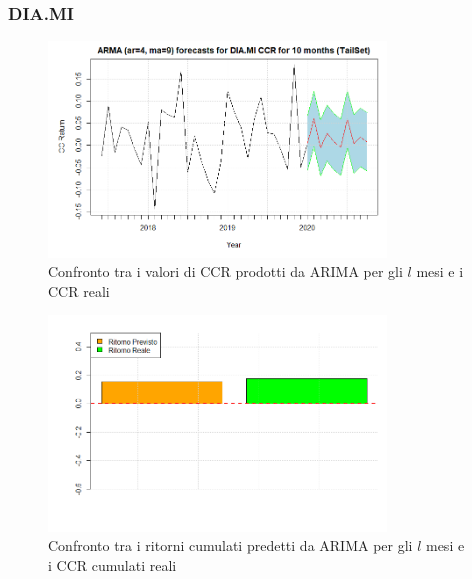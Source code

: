 \documentclass[12pt]{article}
\begin{document}
\subsubsection{DIA.MI}
\begin{figure}[!htb]
    \centering
    \includegraphics[width=0.8\textwidth]{immagini/foreDIA.png}
    \caption{Confronto tra i valori di CCR prodotti da ARIMA per gli $l$ mesi e i CCR reali}
\end{figure}
\FloatBarrier
\begin{figure}[!htb]
    \centering
    \includegraphics[width=0.8\textwidth]{immagini/foreDIAbar.png}
    \caption{Confronto tra i ritorni cumulati predetti da ARIMA per gli $l$ mesi e i CCR cumulati reali}
\end{figure}
\FloatBarrier
\end{document}
